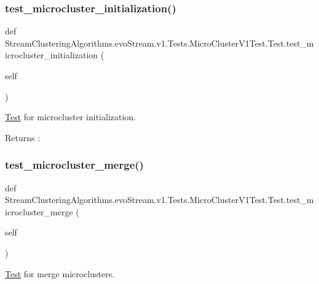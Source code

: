 \subsubsection{\texorpdfstring{test\+\_\+microcluster\+\_\+initialization()}{test\_microcluster\_initialization()}}
{\footnotesize\ttfamily def Stream\+Clustering\+Algorithms.\+evo\+Stream.\+v1.\+Tests.\+Micro\+Cluster\+V1\+Test.\+Test.\+test\+\_\+microcluster\+\_\+initialization (\begin{DoxyParamCaption}\item[{}]{self }\end{DoxyParamCaption})}



\hyperlink{classStreamClusteringAlgorithms_1_1evoStream_1_1v1_1_1Tests_1_1MicroClusterV1Test_1_1Test}{Test} for microcluster initialization. 

\begin{DoxyReturn}{Returns}
\+: 
\end{DoxyReturn}
\mbox{\label{classStreamClusteringAlgorithms_1_1evoStream_1_1v1_1_1Tests_1_1MicroClusterV1Test_1_1Test_aebd05484219193bbe05176e04964b7e8}} 
\subsubsection{\texorpdfstring{test\+\_\+microcluster\+\_\+merge()}{test\_microcluster\_merge()}}
{\footnotesize\ttfamily def Stream\+Clustering\+Algorithms.\+evo\+Stream.\+v1.\+Tests.\+Micro\+Cluster\+V1\+Test.\+Test.\+test\+\_\+microcluster\+\_\+merge (\begin{DoxyParamCaption}\item[{}]{self }\end{DoxyParamCaption})}



\hyperlink{classStreamClusteringAlgorithms_1_1evoStream_1_1v1_1_1Tests_1_1MicroClusterV1Test_1_1Test}{Test} for merge microclusters. 

